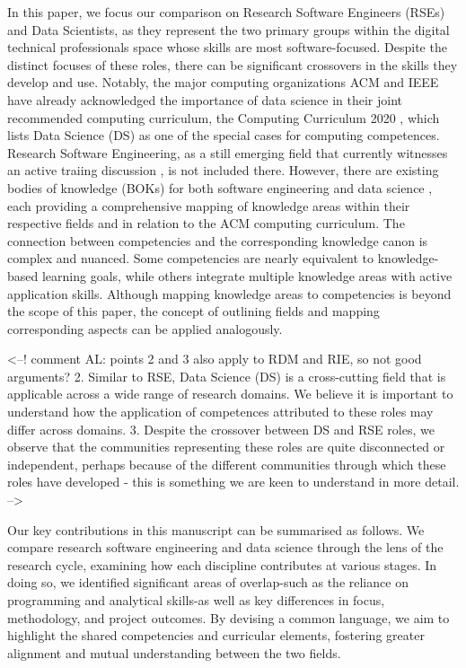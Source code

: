 \documentclass[
        english,biblatex
    ]{lni}
\begin{document}
    In this paper, we focus our comparison on Research Software
    Engineers (RSEs) and Data Scientists, as they represent the two
    primary groups within the digital technical professionals space
    whose skills are most software-focused. Despite the distinct focuses
    of these roles, there can be significant crossovers in the skills
    they develop and use. Notably, the major computing organizations ACM
    and IEEE have already acknowledged the importance of data science in
    their joint recommended computing curriculum, the Computing
    Curriculum 2020 \autocite{CC2020}, which lists Data Science (DS) as
    one of the special cases for computing competences. Research
    Software Engineering, as a still emerging field that currently
    witnesses an active traiing discussion \autocite{Goth2024RSE}, is
    not included there. However, there are existing bodies of knowledge
    (BOKs) for both software engineering \autocite{SWEBOK2014} and data
    science \autocite{DSBOK2017}, each providing a comprehensive mapping
    of knowledge areas within their respective fields and in relation to
    the ACM computing curriculum. The connection between competencies
    and the corresponding knowledge canon is complex and nuanced. Some
    competencies are nearly equivalent to knowledge-based learning
    goals, while others integrate multiple knowledge areas with active
    application skills. Although mapping knowledge areas to competencies
    is beyond the scope of this paper, the concept of outlining fields
    and mapping corresponding aspects can be applied analogously.

    \textless--! comment AL: points 2 and 3 also apply to RDM and RIE,
    so not good arguments? 2. Similar to RSE, Data Science (DS) is a
    cross-cutting field that is applicable across a wide range of
    research domains. We believe it is important to understand how the
    application of competences attributed to these roles may differ
    across domains. 3. Despite the crossover between DS and RSE roles,
    we observe that the communities representing these roles are quite
    disconnected or independent, perhaps because of the different
    communities through which these roles have developed - this is
    something we are keen to understand in more detail. --\textgreater{}

    Our key contributions in this manuscript can be summarised as
    follows. We compare research software engineering and data science
    through the lens of the research cycle, examining how each
    discipline contributes at various stages. In doing so, we identified
    significant areas of overlap-such as the reliance on programming and
    analytical skills-as well as key differences in focus, methodology,
    and project outcomes. By devising a common language, we aim to
    highlight the shared competencies and curricular elements, fostering
    greater alignment and mutual understanding between the two fields.
\end{document}
